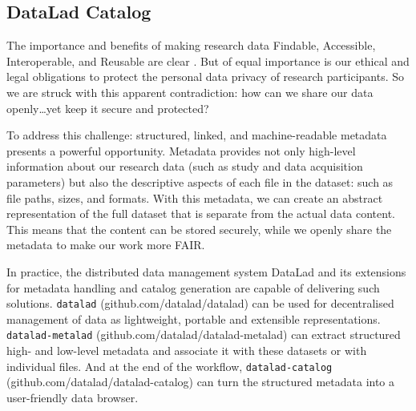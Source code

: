 \documentclass[../main.tex]{subfiles}
\begin{document}
\subsection{DataLad Catalog}

%

The importance and benefits of making research data Findable, Accessible, Interoperable, and Reusable are clear \parencite{Wilkinson2016}. But of equal importance is our ethical and legal obligations to protect the personal data privacy of research participants. So we are struck with this apparent contradiction: how can we share our data openly…yet keep it secure and protected?

To address this challenge: structured, linked, and machine-readable metadata presents a powerful opportunity. Metadata provides not only high-level information about our research data (such as study and data acquisition parameters) but also the descriptive aspects of each file in the dataset: such as file paths, sizes, and formats. With this metadata, we can create an abstract representation of the full dataset that is separate from the actual data content. This means that the content can be stored securely, while we openly share the metadata to make our work more FAIR.

In practice, the distributed data management system DataLad \parencite{Halchenko2021} and its extensions for metadata handling and catalog generation are capable of delivering such solutions. \texttt{datalad} (github.com/datalad/datalad) can be used for decentralised management of data as lightweight, portable and extensible representations. \texttt{datalad-metalad} (github.com/datalad/datalad-metalad) can extract structured high- and low-level metadata and associate it with these datasets or with individual files. And at the end of the workflow, \texttt{datalad-catalog} (github.com/datalad/datalad-catalog) can turn the structured metadata into a user-friendly data browser.
\end{document}
